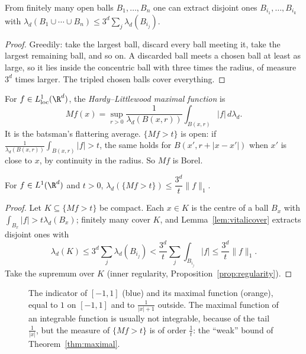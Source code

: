 \begin{lemma}\label{lem:vitalicover}
From finitely many open balls $B_1,\dots,B_n$ one can extract disjoint ones $B_{i_1},\dots,B_{i_k}$ with $\lambda_d(B_1\cup\cdots\cup B_n)\le3^d\sum_j\lambda_d(B_{i_j})$.
\end{lemma}
\begin{proof}
Greedily: take the largest ball, discard every ball meeting it, take the largest remaining ball, and so on. A discarded ball meets a chosen ball at least as large, so it lies inside the concentric
ball with three times the radius, of measure $3^d$ times larger. The tripled chosen balls cover everything.
\end{proof}

For $f\in L^1_{\mathrm{loc}}(\R^d)$, the \emph{Hardy--Littlewood maximal function} is
\[Mf(x)=\sup_{r>0}\frac1{\lambda_d(B(x,r))}\int_{B(x,r)}|f|\,d\lambda_d.\]
It is the batsman's flattering average. $\{Mf>t\}$ is open: if $\frac1{\lambda_d(B(x,r))}\int_{B(x,r)}|f|>t$, the same holds for $B(x',r+|x-x'|)$ when $x'$ is close to $x$, by continuity in the radius. So $Mf$ is
Borel.

\begin{theorem}\label{thm:maximal}
For $f\in L^1(\R^d)$ and $t>0$, $\lambda_d(\{Mf>t\})\le\dfrac{3^d}t\|f\|_1$.
\end{theorem}
\begin{proof}
Let $K\subseteq\{Mf>t\}$ be compact. Each $x\in K$ is the centre of a ball $B_x$ with $\int_{B_x}|f|>t\lambda_d(B_x)$; finitely many cover $K$, and Lemma~\ref{lem:vitalicover} extracts disjoint ones with
\[\lambda_d(K)\le3^d\sum_j\lambda_d(B_{i_j})<\frac{3^d}t\sum_j\int_{B_{i_j}}|f|\le\frac{3^d}t\|f\|_1.\]
Take the supremum over $K$ (inner regularity, Proposition~\ref{prop:regularity}).
\end{proof}

\begin{figure}[ht]
\centering
{}
\caption{The indicator of $[-1,1]$ (blue) and its maximal function (orange), equal to $1$ on $[-1,1]$ and to $\frac1{|x|+1}$ outside. The maximal function of an integrable function is usually not integrable,
because of the tail $\frac1{|x|}$, but the measure of $\{Mf>t\}$ is of order $\frac1t$: the ``weak'' bound of Theorem~\ref{thm:maximal}.}
\label{fig:maximal}
\end{figure}

